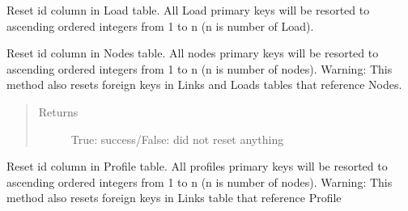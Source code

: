 \documentclass[letterpaper,10pt,english]{sphinxmanual}
\begin{document}
\begin{fulllineitems}
\begin{fulllineitems}
\end{fulllineitems}


\begin{fulllineitems}
\label{\detokenize{api:beamon.database.Database.sort_load_indexes}}
Reset id column in Load table.
All Load primary keys will be resorted to ascending ordered integers from 1 to n (n is number of Load).

\end{fulllineitems}


\begin{fulllineitems}
\label{\detokenize{api:beamon.database.Database.sort_node_indexes}}
Reset id column in Nodes table.
All nodes primary keys will be resorted to ascending ordered integers from 1 to n (n is number of nodes).
Warning: This method also resets foreign keys in Links and Loads tables that reference Nodes.
\begin{quote}\begin{description}
\item[{Returns}] \leavevmode
True: success/False: did not reset anything

\end{description}\end{quote}

\end{fulllineitems}


\begin{fulllineitems}
\label{\detokenize{api:beamon.database.Database.sort_profile_indexes}}
Reset id column in Profile table.
All profiles primary keys will be resorted to ascending ordered integers from 1 to n (n is number of nodes).
Warning: This method also resets foreign keys in Links table that reference Profile

\end{fulllineitems}


\end{fulllineitems}
\end{document}
